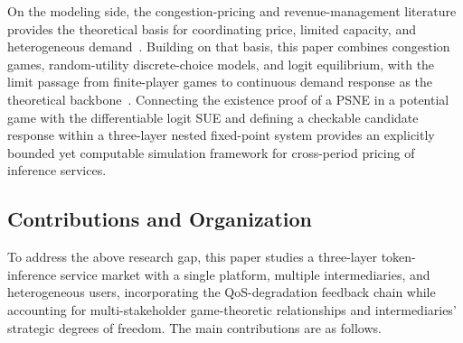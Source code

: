 \documentclass[11pt,a4paper]{article}
\begin{document}
On the modeling side, the congestion-pricing and revenue-management literature provides the theoretical basis for coordinating price, limited capacity, and heterogeneous demand~\cite{vickrey1969congestion,gallego1994dynamic,elmaghraby2003dynamic,bitran2003overview,talluri2004revenue,phillips2005pricing}. Building on that basis, this paper combines congestion games, random-utility discrete-choice models, and logit equilibrium, with the limit passage from finite-player games to continuous demand response as the theoretical backbone~\cite{rosenthal1973class,monderer1996potential,wardrop1952some,sandholm2010population,mcfadden1974conditional,train2009discrete}. Connecting the existence proof of a PSNE in a potential game with the differentiable logit SUE and defining a checkable candidate response within a three-layer nested fixed-point system provides an explicitly bounded yet computable simulation framework for cross-period pricing of inference services.

\subsection{Contributions and Organization}

To address the above research gap, this paper studies a three-layer token-inference service market with a single platform, multiple intermediaries, and heterogeneous users, incorporating the QoS-degradation feedback chain while accounting for multi-stakeholder game-theoretic relationships and intermediaries' strategic degrees of freedom. The main contributions are as follows.
\end{document}
